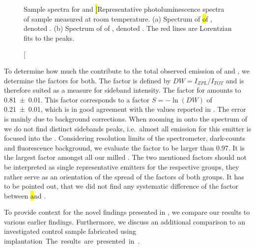 \begin{figure}[!htb]
\begin{subfigure}{0.5\linewidth}
			\caption{}\label{subfig::embroad}
		\end{subfigure}
		\caption[Sample \siv \pl spectra for \vl and \hl]{Representative photoluminescence spectra of sample \insituHao measured at room temperature. (a) Spectrum of \hl of , denoted \emnarrow. (b) Spectrum of \vl of , denoted \embroad. The red lines are Lorentzian fits to the peaks.}
		\label{fig::spectra}
	\end{figure}

	To determine how much the \ZPLs contribute to the total observed emission of \emnarrow and \embroad, we determine the \db factors for both.
	The \db factor is defined by $DW = I_{ZPL}/I_{TOT}$ and is therefore suited as a measure for sideband intensity.
	The \db factor for \emnarrow amounts to \num[separate-uncertainty]{0.81(1)}.
	This \db factor corresponds to a \hr factor $S =- \ln{(DW)}$ \cite{Walker1979} of \num[separate-uncertainty]{0.21(1)}, which is in good agreement with the values reported in \cite{Neu2011b}.
	The error is mainly due to background corrections.
	When zooming in onto the spectrum of \embroad we do not find distinct sidebands peaks, i.e.\ almost all emission for this emitter is focused into the \ZPL.
	Considering resolution limits of the spectrometer, dark-counts and fluorescence background, we evaluate the \db factor to be larger than \num[separate-uncertainty]{0.97}.
	It is the largest \db factor amongst all our milled \sivs.
	The two mentioned \db factors should not be interpreted as single representative emitters for the respective groups, they rather serve as an orientation of the spread of the \db factors of both groups.
	It has to be pointed out, that we did not find any systematic difference of the \db factor between \hl and \vl.
	
	To provide context for the novel findings presented in , we compare our results to various earlier findings.
	Furthermore, we discuss an additional comparison to an investigated control sample fabricated using \si implantation.
	The results are presented in .


